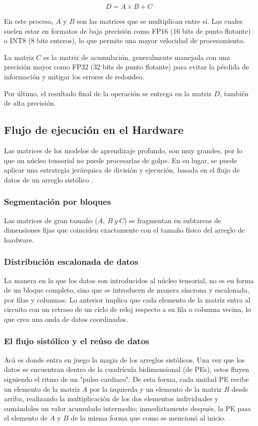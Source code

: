 \documentclass[conference]{IEEEtran}
\begin{document}
\begin{equation}
  D = A \times B + C
  \label{eq:MMA}
\end{equation}

En este proceso, $A$ y $B$ son las matrices que se multiplican entre sí. Las cuales suelen estar 
en formatos de baja precisión como FP16 (16 bits de punto flotante) o INT8 (8 bits enteros), lo que 
permite una mayor velocidad de procesamiento.

La matriz $C$ es la matriz de acumulación, generalmente manejada con una precisión mayor como FP32 (32 bits de punto flotante) para 
evitar la pérdida de información y mitigar los errores de redondeo.

Por último, el resultado final de la operación se entrega en la matriz $D$, también de alta precisión.

\subsection{Flujo de ejecución en el Hardware}
Las matrices de los modelos de aprendizaje profundo, son muy grandes, por lo que 
un núcleo tensorial no puede procesarlas de golpe. En su lugar, se puede aplicar una
estrategia jerárquica de división y ejecución, basada en el flujo
de datos de un arreglo sistólico \cite{feng2025tensor}.

\subsubsection{Segmentación por bloques} 
Las matrices de gran tamaño ($A,~B~y~C$) se fragmentan en subtareas de dimensiones fijas
que coinciden exactamente con el tamaño físico del arreglo de hardware.


\subsubsection{Distribución escalonada de datos}
La manera en la que los datos son introducidos al núcleo tensorial, no es en forma de un 
bloque completo, sino que se introducen de manera síncrona y escalonada, por filas y columnas.
Lo anterior implica que cada elemento de la matriz entra al circuito con un retraso de un ciclo
de reloj respecto a su fila o columna vecina, lo que crea una onda de datos coordinados. 

\subsubsection{El flujo sistólico y el reúso de datos}
Acá es donde entra en juego la magia de los arreglos sistólicos. Una vez que los datos se encuentran
dentro de la cuadrícula bidimensional (de PEs), estos fluyen siguiendo el ritmo de un "pulso cardiaco".
De esta forma, cada unidad PE recibe un elemento de la matriz $A$ por la izquierda y un elemento de la matriz $B$ 
desde arriba, realizando la multiplicación de los dos elementos individuales y sumándoles un valor acumulado intermedio;
inmediatamente después, la PE pasa el elemento de $A$ y $B$ de la misma forma que como se mencionó al inicio.
\end{document}
